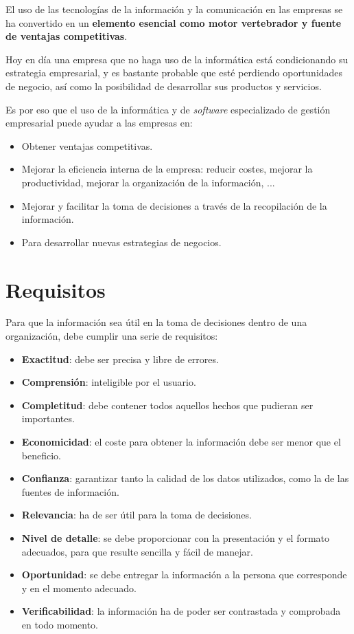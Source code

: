 El uso de las tecnologías de la información y la comunicación en las empresas se ha convertido en un \textbf{elemento esencial como motor vertebrador y fuente de ventajas competitivas}.

Hoy en día una empresa que no haga uso de la informática está condicionando su estrategia empresarial, y es bastante probable que esté perdiendo oportunidades de negocio, así como la posibilidad de desarrollar sus productos y servicios.

Es por eso que el uso de la informática y de \textit{software} especializado de gestión empresarial puede ayudar a las empresas en:

\begin{itemize}
    \item Obtener ventajas competitivas.
    \item Mejorar la eficiencia interna de la empresa: reducir costes, mejorar la productividad, mejorar la organización de la información, ...
    \item Mejorar y facilitar la toma de decisiones a través de la recopilación de la información.
    \item Para desarrollar nuevas estrategias de negocios.
\end{itemize}

\section{Requisitos}

Para que la información sea útil en la toma de decisiones dentro de una organización, debe cumplir una serie de requisitos:

\begin{itemize}
    \item \textbf{Exactitud}: debe ser precisa y libre de errores.
    \item \textbf{Comprensión}: inteligible por el usuario.
    \item \textbf{Completitud}: debe contener todos aquellos hechos que pudieran ser importantes.
    \item \textbf{Economicidad}: el coste para obtener la información debe ser menor que el beneficio.
    \item \textbf{Confianza}: garantizar tanto la calidad de los datos utilizados, como la de las fuentes de información.
    \item \textbf{Relevancia}: ha de ser útil para la toma de decisiones.
    \item \textbf{Nivel de detalle}: se debe proporcionar con la presentación y el formato adecuados, para que resulte sencilla y fácil de manejar.
    \item \textbf{Oportunidad}: se debe entregar la información a la persona que corresponde y en el momento adecuado.
    \item \textbf{Verificabilidad}: la información ha de poder ser contrastada y comprobada en todo momento.
\end{itemize}


